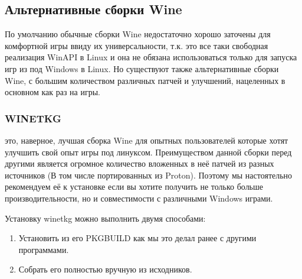\documentclass[letterpaper,10pt,russian,openany]{sphinxmanual}
\begin{document}
\ignorespaces 

\subsection{Альтернативные сборки Wine}
\label{\detokenize{source/linux-gaming:alternative-wine-builds}}\label{\detokenize{source/linux-gaming:index-4}}\label{\detokenize{source/linux-gaming:id4}}
\sphinxAtStartPar
По умолчанию обычные сборки Wine недостаточно хорошо заточены для комфортной игры ввиду их универсальности,
т.к. это все таки свободная реализация WinAPI в Linux и она не обязана использоваться только для запуска игр из под Windows в Linux.
Но существуют также альтернативные сборки Wine, с большим количеством различных патчей и улучшений, нацеленных в основном как раз на игры.

\ignorespaces 

\subsubsection{WINE\sphinxhyphen{}TKG}
\label{\detokenize{source/linux-gaming:wine-tkg}}\label{\detokenize{source/linux-gaming:wine-tkg-git}}\label{\detokenize{source/linux-gaming:index-5}}
\sphinxAtStartPar
{} \sphinxhyphen{} это, наверное, лучшая сборка Wine для опытных пользователей которые хотят улучшить свой опыт игры под линуксом.
Преимуществом данной сборки перед другими является огромное количество вложенных в неё патчей из разных источников (В том числе портированных из Proton).
Поэтому мы настоятельно рекомендуем её к установке если вы хотите получить не только больше производительности, но и совместимости с различными Windows играми.

\sphinxAtStartPar
Установку wine\sphinxhyphen{}tkg можно выполнить двумя способами:
\begin{enumerate}
%
\item {} 
\sphinxAtStartPar
Установить из его PKGBUILD как мы это делал ранее с другими программами.

\item {} 
\sphinxAtStartPar
Собрать его полностью вручную из исходников.

\end{enumerate}
\end{document}
